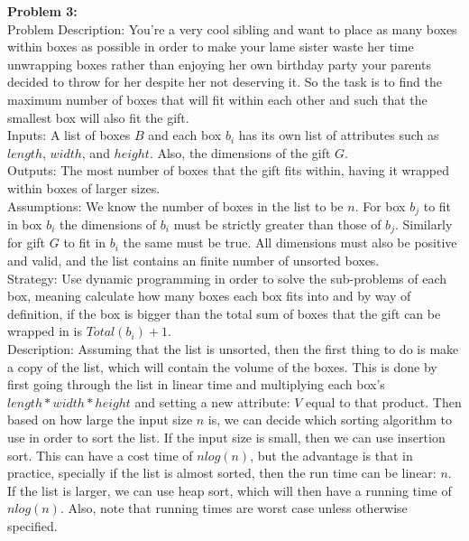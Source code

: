 \documentclass{article}
\begin{document}
\textbf{Problem 3:}\\
Problem Description: You're a very cool sibling and want to place as many boxes within boxes as possible in order to make your lame sister waste her time unwrapping boxes rather than enjoying her own birthday party your parents decided to throw for her despite her not deserving it. So the task is to find the maximum number of boxes that will fit within each other and such that the smallest box will also fit the gift. \\
Inputs: A list of boxes $B$ and each box $b_i$ has its own list of attributes such as $length$, $width$, and $height$. Also, the dimensions of the gift $G$.\\
Outputs: The most number of boxes that the gift fits within, having it wrapped within boxes of larger sizes. \\
Assumptions: We know the number of boxes in the list to be $n$. For box $b_j$ to fit in box $b_i$ the dimensions of $b_i$ must be strictly greater than those of $b_j$. Similarly for gift $G$ to fit in $b_i$ the same must be true. All dimensions must also be positive and valid, and the list contains an finite number of unsorted boxes.\\ 
Strategy: Use dynamic programming in order to solve the sub-problems of each box, meaning calculate how many boxes each box fits into and by way of definition, if the box is bigger than the total sum of boxes that the gift can be wrapped in is $Total(b_i) + 1$. \\
Description: Assuming that the list is unsorted, then the first thing to do is make a copy of the list, which will contain the volume of the boxes. This is done by first going through the list in linear time and multiplying each box's $length*width*height$ and setting a new attribute: $V$ equal to that product. Then based on how  large the input size $n$ is, we can decide which sorting algorithm to use in order to sort the list. If the input size is small, then we can use insertion sort. This can have a cost time of $nlog(n)$, but the advantage is that in practice, specially if the list is almost sorted, then the run time can be linear: $n$. If the list is larger, we can use heap sort, which will then have a running time of $nlog(n)$. Also, note that running times are worst case unless otherwise specified. 
\end{document}
